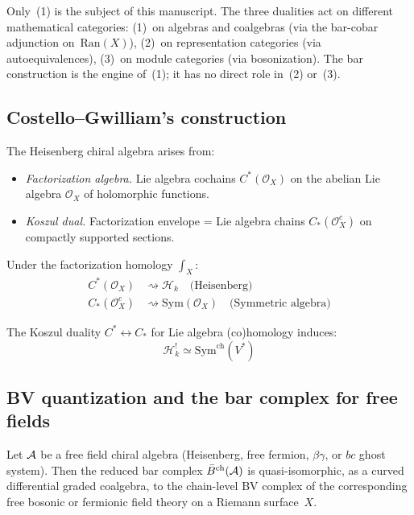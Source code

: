 Only~(1) is the subject of this manuscript.  The three dualities
act on different mathematical categories: (1)~on algebras and
coalgebras (via the bar-cobar adjunction on~$\mathrm{Ran}(X)$),
(2)~on representation categories (via autoequivalences),
(3)~on module categories (via bosonization).  The bar construction
is the engine of~(1); it has no direct role in~(2) or~(3).

\subsection{Costello--Gwilliam's construction}

\begin{theorem}
\label{thm:rhagavendran-heisenberg}
The Heisenberg chiral algebra arises from:
\begin{itemize}
\item \emph{Factorization algebra.} Lie algebra cochains $C^*(\mathcal{O}_X)$ on the
      abelian Lie algebra $\mathcal{O}_X$ of holomorphic functions.
\item \emph{Koszul dual.} Factorization envelope = Lie algebra chains $C_*(\mathcal{O}_X^c)$
      on compactly supported sections.
\end{itemize}

Under the factorization homology $\int_X$:
\begin{align*}
C^*(\mathcal{O}_X) &\rightsquigarrow \mathcal{H}_k \quad \text{(Heisenberg)} \\
C_*(\mathcal{O}_X^c) &\rightsquigarrow \text{Sym}(\mathcal{O}_X) \quad \text{(Symmetric algebra)}
\end{align*}

The Koszul duality $C^* \leftrightarrow C_*$ for Lie algebra (co)homology induces:
\[\mathcal{H}_k^! \simeq \mathrm{Sym}^{\mathrm{ch}}(V^*)\]
\end{theorem}

\subsection{BV quantization and the bar complex for free fields}
\label{sec:bv-bar-free-fields}

\begin{proposition}
\label{prop:bar-bv-free-fields}
Let $\mathcal{A}$ be a free field chiral algebra \textup{(}Heisenberg, free fermion,
$\beta\gamma$, or $bc$ ghost system\textup{)}.  Then the reduced bar complex
$\bar{B}^{\mathrm{ch}}(\mathcal{A})$ is quasi-isomorphic, as a curved differential
graded coalgebra, to the chain-level BV complex of the corresponding free
bosonic or fermionic field theory on a Riemann surface~$X$.
\end{proposition}

